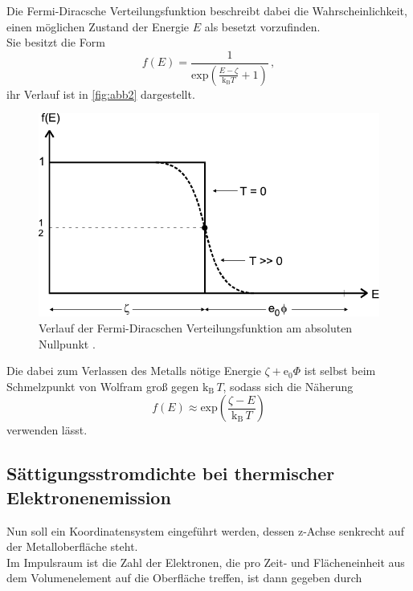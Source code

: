 Die Fermi-Diracsche Verteilungsfunktion beschreibt dabei die Wahrscheinlichkeit,
einen möglichen Zustand der Energie $E$ als besetzt vorzufinden. \\
Sie besitzt die Form
\begin{equation*}
    f(E) = \dfrac{1}{\text{exp}(\frac{E - \zeta}{\text{k}_\text{B} T} + 1)} \,,
\end{equation*}
ihr Verlauf ist in \autoref{fig:abb2} dargestellt.

\begin{figure}[H]
    \centering
    \includegraphics{figures/Abb2.pdf}
    \caption{Verlauf der Fermi-Diracschen Verteilungsfunktion am absoluten Nullpunkt \cite{ap09}.}
    \label{fig:abb2}
\end{figure}

Die dabei zum Verlassen des Metalls nötige Energie $\zeta + \text{e}_0 \Phi$
ist selbst beim Schmelzpunkt von Wolfram groß gegen $\text{k}_\text{B} \,T$,
sodass sich die Näherung
\begin{equation}
    f(E) \approx \text{exp}\left(\dfrac{\zeta - E}{\text{k}_\text{B} \, T} \right)
    \label{eq:approxfermidirac}
\end{equation}
verwenden lässt.


\subsection{Sättigungsstromdichte bei thermischer Elektronenemission}

Nun soll ein Koordinatensystem eingeführt werden, dessen z-Achse
senkrecht auf der Metalloberfläche steht. \\

Im Impulsraum ist die Zahl der Elektronen, die pro Zeit- und Flächeneinheit aus dem Volumenelement
auf die Oberfläche treffen, ist dann gegeben durch

